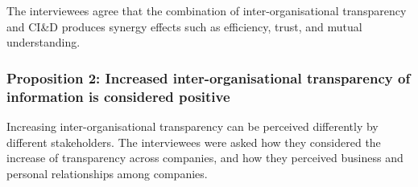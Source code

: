 

 The interviewees agree that the combination of inter-organisational transparency and CI\&D produces synergy effects such as efficiency, trust, and mutual understanding.

\subsubsection{Proposition 2: Increased inter-organisational transparency of information is considered positive}

Increasing inter-organisational transparency can be perceived differently by different stakeholders. The interviewees were asked how they considered the increase of transparency across companies, and how they perceived business and personal relationships among companies. 



